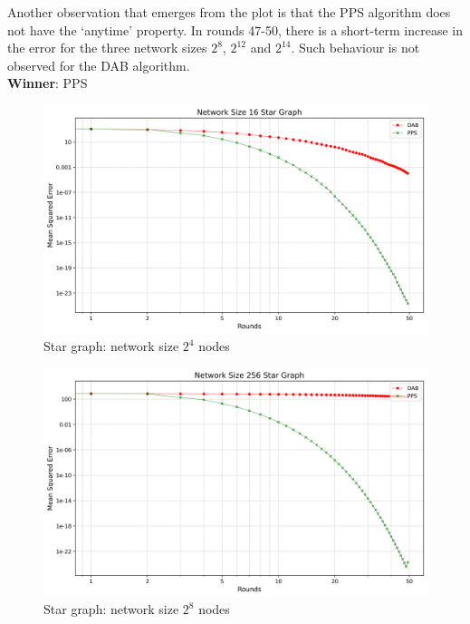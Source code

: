Another observation that emerges from the plot is that the PPS algorithm does not have the ‘anytime’ property. In rounds 47-50, there is a short-term increase in the error for the three network sizes $2^{8}$, $2^{12}$ and $2^{14}$. Such behaviour is not observed for the DAB algorithm.\\
\textbf{Winner}: PPS
\begin{figure}[H]
    \centering
    \includegraphics[scale=0.5]{figures/starGraphSimulations/DAB_vs_PPS_SG_r50_n16.png}
    \caption{Star graph: network size $2^{4}$ nodes}
    \label{fig:16StarGraph}
\end{figure}

\begin{figure}[H]
    \centering
    \includegraphics[scale=0.5]{figures/starGraphSimulations/DAB_vs_PPS_SG_r50_n256.png}
    \caption{Star graph: network size $2^{8}$ nodes}
    \label{fig:256StarGraph}
\end{figure}

